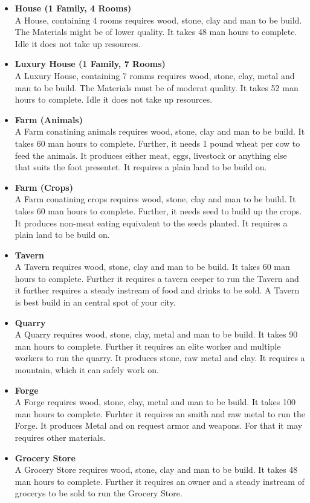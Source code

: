 \documentclass[10pt,twoside,twocolumn,openany]{book}
\begin{document}
\begin{itemize}
\item \textbf{House (1 Family, 4 Rooms)} \\ A House, containing 4 rooms requires wood, stone, clay and man to be build. The Materials might be of lower quality. It takes 48 man hours to complete. Idle it does not take up resources.
\item \textbf{Luxury House (1 Family, 7 Rooms)} \\ A Luxury House, containing 7 romms requires wood, stone, clay, metal and man to be build. The Materials must be of moderat quality. It takes 52 man hours to complete. Idle it does not take up resources.
\item \textbf{Farm (Animals)} \\ A Farm conatining animals requires wood, stone, clay and man to be build. It takes 60 man hours to complete. Further, it needs 1 pound wheat per cow to feed the animals. It produces either meat, eggs, livestock or anything else that suits the foot presentet. It requires a plain land to be build on.
\item \textbf{Farm (Crops)} \\ A Farm conatining crops requires wood, stone, clay and man to be build. It takes 60 man hours to complete. Further, it needs seed to build up the crops. It produces non-meat eating equivalent to the seeds planted. It requires a plain land to be build on.
\item \textbf{Tavern} \\ A Tavern requires wood, stone, clay and man to be build. It takes 60 man hours to complete. Further it requires a tavern ceeper to run the Tavern and it further requires a steady instream of food and drinks to be sold. A Tavern is best build in an central spot of your city.
\item \textbf{Quarry} \\ A Quarry requires wood, stone, clay, metal and man to be build. It takes 90 man hours to complete. Further it requires an elite worker and multiple workers to run the quarry. It produces stone, raw metal and clay. It requires a mountain, which it can safely work on.
\item \textbf{Forge} \\ A Forge requires wood, stone, clay, metal and man to be build. It takes 100 man hours to complete. Furhter it requires an smith and raw metal to run the Forge. It produces Metal and on request armor and weapons. For that it may requires other materials.
\item \textbf{Grocery Store} \\ A Grocery Store requires wood, stone, clay and man to be build. It takes 48 man hours to complete. Further it requires an owner and a steady instream of grocerys to be sold to run the Grocery Store.

\end{itemize}
\end{document}
